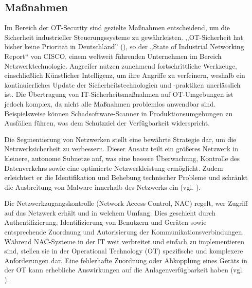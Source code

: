 \subsection{Maßnahmen}


Im Bereich der OT-Security sind gezielte Maßnahmen entscheidend, um die Sicherheit industrieller Steuerungssysteme zu gewährleisten. ,,OT-Sicherheit hat bisher keine Priorität in Deutschland'' (\cite{CISCO}), so der „State of Industrial Networking Report“ von CISCO, einem weltweit führenden Unternehmen im Bereich Netzwerktechnologie. Angreifer nutzen zunehmend fortschrittliche Werkzeuge, einschließlich Künstlicher Intelligenz, um ihre Angriffe zu verfeinern, weshalb ein kontinuierliches Update der Sicherheitstechnologien und -praktiken unerlässlich ist. Die Übertragung von IT-Sicherheitsmaßnahmen auf OT-Umgebungen ist jedoch komplex, da nicht alle Maßnahmen problemlos anwendbar sind. Beispielsweise können Schadsoftware-Scanner in Produktionsumgebungen zu Ausfällen führen, was dem Schutzziel der Verfügbarkeit widerspricht.

Die Segmentierung von Netzwerken stellt eine bewährte Strategie dar, um die Netzwerksicherheit zu verbessern. Dieser Ansatz teilt ein größeres Netzwerk in kleinere, autonome Subnetze auf, was eine bessere Überwachung, Kontrolle des Datenverkehrs sowie eine optimierte Netzwerkleistung ermöglicht. Zudem erleichtert er die Identifikation und Behebung technischer Probleme und schränkt die Ausbreitung von Malware innerhalb des Netzwerks ein (vgl. \cite{Netzwerksegmentierung}).

Die Netzwerkzugangskontrolle (Network Access Control, NAC) regelt, wer Zugriff auf das Netzwerk erhält und in welchem Umfang. Dies geschieht durch Authentifizierung, Identifizierung von Benutzern und Geräten sowie entsprechende Zuordnung und Autorisierung der Kommunikationsverbindungen. Während NAC-Systeme in der IT weit verbreitet und einfach zu implementieren sind, stellen sie in der Operational Technology (OT) spezifische und komplexere Anforderungen dar. Eine fehlerhafte Zuordnung oder Abkopplung eines Geräts in der OT kann erhebliche Auswirkungen auf die Anlagenverfügbarkeit haben (vgl. \cite{NAC}).

